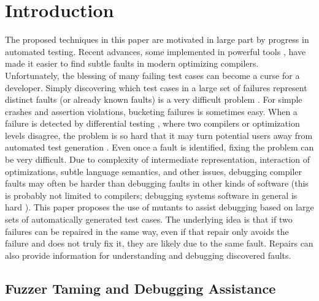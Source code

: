 \section{Introduction}

The proposed techniques in this paper are motivated in large part by progress in automated testing.  Recent advances, some implemented in powerful tools \cite{csmith,jsfunfuzz,ISSTA12,LangFuzz,ZhendongPLDI,ZhendongOOPSLA}, have made it easier to find subtle faults in modern optimizing compilers.  Unfortunately, the blessing of many failing test cases can become a curse for a developer.  Simply discovering which test cases in a large set of failures represent distinct faults (or already known faults) is a very difficult problem \cite{PLDI13,Podgurski04}.  For simple crashes and assertion violations, bucketing failures is sometimes easy.  When a failure is detected by differential testing \cite{Differential}, where two compilers or optimization levels disagree, the problem is so hard that it may turn potential users away from automated test generation \cite{PLDI13}.  Even once a fault is identified, fixing the problem can be very difficult.  Due to complexity of intermediate representation, interaction of optimizations, subtle language semantics, and other issues, debugging compiler faults may often be harder than debugging faults in other kinds of software (this is probably not limited to compilers; debugging systems software in general is hard \cite{mickens}).
This paper proposes the use of mutants \cite{mutant} to assist debugging based on large sets of automatically generated test cases.  The underlying idea is that if two failures can be repaired in the same way, even if that repair only avoids the failure and does not truly fix it, they are likely due to the same fault. Repairs can also provide  information for understanding and debugging discovered faults. 

\subsection{Fuzzer Taming and Debugging Assistance}

